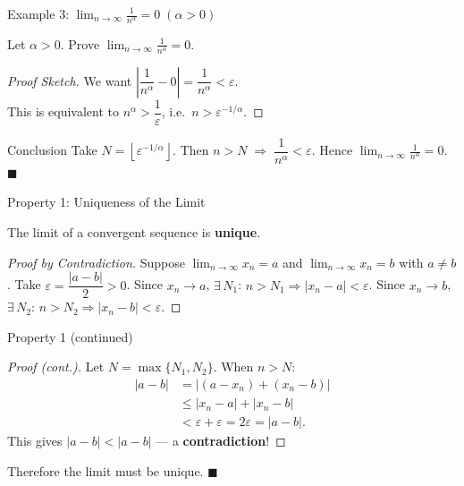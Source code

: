 \documentclass[aspectratio=169,10pt]{beamer}
\begin{document}
\begin{frame}{Example 3: $\displaystyle\lim_{n\to\infty}\frac{1}{n^\alpha}=0\;(\alpha>0)$}
  \begin{example}
    Let $\alpha > 0$. Prove $\displaystyle\lim_{n\to\infty}\frac{1}{n^\alpha}=0$.
  \end{example}
  \pause
  \begin{proof}[Proof Sketch]
    We want $\left|\dfrac{1}{n^\alpha}-0\right| = \dfrac{1}{n^\alpha} < \varepsilon$.\\[6pt]
    This is equivalent to $n^\alpha > \dfrac{1}{\varepsilon}$, i.e.\ $n > \varepsilon^{-1/\alpha}$.
  \end{proof}
  \pause
  \begin{block}{Conclusion}
    Take $N = \left\lfloor\varepsilon^{-1/\alpha}\right\rfloor$.
    Then $n > N \;\Longrightarrow\; \dfrac{1}{n^\alpha} < \varepsilon$.
    Hence $\displaystyle\lim_{n\to\infty}\frac{1}{n^\alpha}=0$.
    \hfill$\blacksquare$
  \end{block}
\end{frame}

\begin{frame}{Property 1: Uniqueness of the Limit}
  \begin{theorem}[Uniqueness]
    The limit of a convergent sequence is \textbf{unique}.
  \end{theorem}
  \pause
  \begin{proof}[Proof by Contradiction]
    Suppose $\displaystyle\lim_{n\to\infty}x_n = a$ and
    $\displaystyle\lim_{n\to\infty}x_n = b$ with $a \neq b$.
    \pause
    Take $\varepsilon = \dfrac{|a-b|}{2}>0$.
    \pause
    Since $x_n \to a$, $\exists\,N_1$: $n>N_1 \Rightarrow |x_n-a|<\varepsilon$.
    \pause
    Since $x_n \to b$, $\exists\,N_2$: $n>N_2 \Rightarrow |x_n-b|<\varepsilon$.
  \end{proof}
\end{frame}

\begin{frame}{Property 1 (continued)}
  \begin{proof}[Proof (cont.)]
    Let $N = \max\{N_1,N_2\}$. When $n > N$:
    \begin{align*}
      |a-b| &= |(a-x_n)+(x_n-b)| \\
            &\leq |x_n-a| + |x_n-b| \\
            &< \varepsilon + \varepsilon = 2\varepsilon = |a-b|.
    \end{align*}
    \pause
    This gives $|a-b| < |a-b|$ --- a \textbf{contradiction}!
  \end{proof}
  \pause
  \begin{center}
    Therefore the limit must be unique. \hfill$\blacksquare$
  \end{center}
\end{frame}
\end{document}
